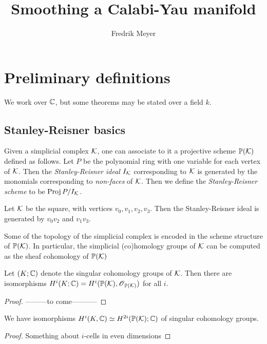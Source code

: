 \documentclass[]{uiophd}
\begin{document}
\title{Smoothing a Calabi-Yau manifold}
\author{Fredrik Meyer}
\maketitle 

\chapter{Preliminary definitions}

We work over $\mathbb{C}$, but some theorems may be stated over a field $k$.

\section{Stanley-Reisner basics}

Given a simplicial complex $\mathcal K$, one can associate to it a projective scheme $\mathbb{P}(\mathcal K)$ defined as follows. Let $P$ be the polynomial ring with one variable for each vertex of $\mathcal K$. Then the \emph{Stanley-Reisner ideal $I_\mathcal K$} corresponding to $\mathcal K$ is generated by the monomials corresponding to \emph{non-faces} of $\mathcal K$. Then we define the \emph{Stanley-Reisner scheme} to be $\operatorname{Proj} P/I_\mathcal K$. 

\begin{example}
Let $\mathcal K$ be the square, with vertices $v_0,v_1,v_2,v_3$. Then the Stanley-Reisner ideal is generated by $v_0v_2$ and $v_1v_3$.
\end{example}

Some of the topology of the simplicial complex is encoded in the scheme structure of $\mathbb{P}(\mathcal K)$. In particular, the simplicial (co)homology groups of $\mathcal K$ can be computed as the sheaf cohomology of $\mathbb{P}(\mathcal K)$

\begin{lemma}
Let $(K;\mathbb{C})$ denote the singular cohomology groups of $\mathcal K$. Then there are isomorphisms $H^i(K;\mathbb{C})=H^i(\mathbb{P}(\mathcal K),\operatorname{\mathscr{O}}_{\mathbb{P}(\mathcal K)})$ for all $i$.
\end{lemma}
\begin{proof}
---------to come-----------
\end{proof}

\begin{corr}
We have isomorphisms $H^i(K,\mathbb{C}) \simeq H^{2i}(\mathbb{P}(\mathcal K);\mathbb{C})$ of singular cohomology groups.
\end{corr}
\begin{proof}
Something about $i$-cells in even dimensions
\end{proof}
\end{document}
